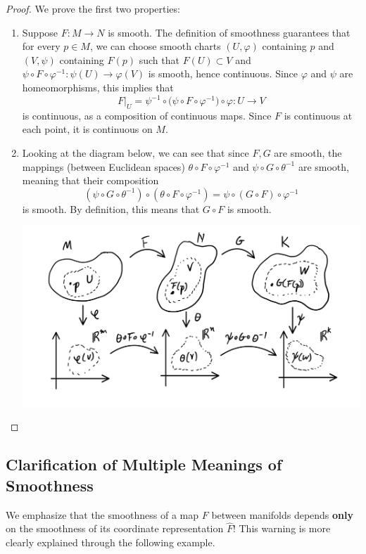 \documentclass{article}
\theoremstyle{remark}
\theoremstyle{definition}
\begin{document}
\begin{proof}
We prove the first two properties: 
\begin{enumerate}
    \item Suppose $F: M \longrightarrow N$ is smooth. The definition of smoothness guarantees that for every $p \in M$, we can choose smooth charts $(U, \varphi)$ containing $p$ and $(V, \psi)$ containing $F(p)$ such that $F(U) \subset V$ and $\psi \circ F \circ \varphi^{-1}: \psi(U) \longrightarrow \varphi(V)$ is smooth, hence continuous. Since $\varphi$ and $\psi$ are homeomorphisms, this implies that
    \[F \big|_U = \psi^{-1} \circ \big( \psi \circ F \circ \varphi^{-1} \big) \circ \varphi : U \longrightarrow V\]
    is continuous, as a composition of continuous maps. Since $F$ is continuous at each point, it is continuous on $M$.
    \item Looking at the diagram below, we can see that since $F, G$ are smooth, the mappings (between Euclidean spaces) $\theta \circ F \circ \varphi^{-1}$ and $\psi \circ G \circ \theta^{-1}$ are smooth, meaning that their composition
    \[(\psi \circ G \circ \theta^{-1}) \circ (\theta \circ F \circ \varphi^{-1}) = \psi \circ (G \circ F) \circ \varphi^{-1}\]
    is smooth. By definition, this means that $G \circ F$ is smooth. 
    \begin{center}
        \includegraphics[scale=0.25]{img/Composition_of_Smooth_Manifold_Mappings.PNG}
    \end{center}
\end{enumerate}
\end{proof}

\subsection{Clarification of Multiple Meanings of Smoothness}
We emphasize that the smoothness of a map $F$ between manifolds depends \textbf{only} on the smoothness of its coordinate representation $\hat{F}$! This warning is more clearly explained through the following example. 
\end{document}
